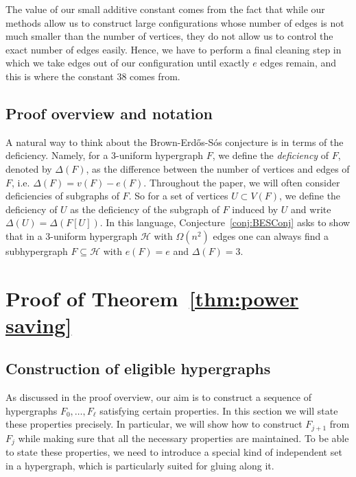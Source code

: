 \documentclass[11pt]{article}
\numberwithin{equation}{section}
\def\cH{\mathcal{H}}
\theoremstyle{plain}
\theoremstyle{remark}
\begin{document}
The value of our small additive constant comes from the fact that while our methods allow us to construct large configurations whose number of edges is not much smaller than the number of vertices, they do not allow us to control the exact number of edges easily. Hence, we have to perform a final cleaning step in which we take edges out of our configuration until exactly $e$ edges remain, and this is where the constant $38$ comes from. 

\subsection{Proof overview and notation}

A natural way to think about the Brown-Erd\H{o}s-S\'os conjecture is in terms of the deficiency. Namely, for a 3-uniform hypergraph $F$, we define the \textit{deficiency} of $F$, denoted by $\Delta(F)$, as the difference between the number of vertices and edges of $F$, i.e. $\Delta(F)=v(F)-e(F)$. Throughout the paper, we will often consider deficiencies of subgraphs of $F$. So for a set of vertices $U\subset V(F)$, we define the deficiency of $U$ as the deficiency of the subgraph of $F$ induced by $U$ and write $\Delta(U)=\Delta(F[U])$. In this language, Conjecture~\ref{conj:BESConj} asks to show that in a 3-uniform hypergraph $\cH$ with $\Omega(n^2)$ edges one can always find a subhypergraph $F\subseteq \cH$ with $e(F)=e$ and $\Delta(F)=3$.

\setcounter{figure}{1}
\section{Proof of Theorem~\ref{thm:power saving}}

\subsection{Construction of eligible hypergraphs}\label{subsec:construction of eligible hypergraphs}

As discussed in the proof overview, our aim is to construct a sequence of hypergraphs $F_0, \dots, F_\ell$ satisfying certain properties. In this section we will state these properties precisely. In particular, we will show how to construct $F_{j+1}$ from $F_j$ while making sure that all the necessary properties are maintained. To be able to state these properties, we need to introduce a special kind of independent set in a hypergraph, which is particularly suited for gluing along it.
\end{document}
